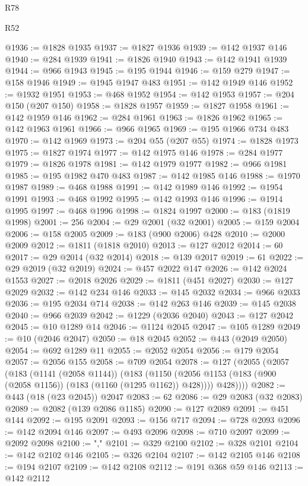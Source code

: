 \begin{lexlean}{R78}
\begin{lexlean}{R52}
\begin{coremodule}
{{{{{{{{{{{{{{{{{{{{{{{{{{{{{{{{{{{{{{{{{{{{{{{{{{{{{{{{{{{{{{{{{{{{{{{{{{{{{{{{{{{{{{{{{{{{{{{{{{{{{{{{{{{{{{{{{{{{{{{{{{{{{{{{{{{{{{{{{{{{{{{{{{{{{{{{{{{{{{{{{{{{{{{{{{{{{{{{{{{{{{{{{{{{{{{{{{{{{{@1936 := @1828 @1935
@1937 := @1827 @1936
@1939 := @142 @1937 @146
@1940 := @284 @1939
@1941 := @1826 @1940
@1943 := @142 @1941 @1939
@1944 := @966 @1943
@1945 := @195 @1944
@1946 := @159 @279
@1947 := @158 @1946
@1949 := @1945 @1947 @483
@1951 := @142 @1949 @146
@1952 := @1932 @1951
@1953 := @468 @1952
@1954 := @142 @1953
@1957 := @204 @150 (@207 @150)
@1958 := @1828 @1957
@1959 := @1827 @1958
@1961 := @142 @1959 @146
@1962 := @284 @1961
@1963 := @1826 @1962
@1965 := @142 @1963 @1961
@1966 := @966 @1965
@1969 := @195 @1966 @734 @483
@1970 := @142 @1969
@1973 := @204 @55 (@207 @55)
@1974 := @1828 @1973
@1975 := @1827 @1974
@1977 := @142 @1975 @146
@1978 := @284 @1977
@1979 := @1826 @1978
@1981 := @142 @1979 @1977
@1982 := @966 @1981
@1985 := @195 @1982 @470 @483
@1987 := @142 @1985 @146
@1988 := @1970 @1987
@1989 := @468 @1988
@1991 := @142 @1989 @146
@1992 := @1954 @1991
@1993 := @468 @1992
@1995 := @142 @1993 @146
@1996 := @1914 @1995
@1997 := @468 @1996
@1998 := @1824 @1997
@2000 := @183 (@1819 @1998)
@2001 := 256
@2004 := @29 @2001 (@32 @2001)
@2005 := @159 @2004
@2006 := @158 @2005
@2009 := @183 (@900 @2006) @428
@2010 := @2000 @2009
@2012 := @1811 (@1818 @2010)
@2013 := @127 @2012
@2014 := 60
@2017 := @29 @2014 (@32 @2014)
@2018 := @139 @2017
@2019 := 61
@2022 := @29 @2019 (@32 @2019)
@2024 := @457 @2022 @147
@2026 := @142 @2024 @1553
@2027 := @2018 @2026
@2029 := @1811 (@451 @2027)
@2030 := @127 @2029
@2032 := @142 @234 @146
@2033 := @145 @2032
@2034 := @966 @2033
@2036 := @195 @2034 @714
@2038 := @142 @263 @146
@2039 := @145 @2038
@2040 := @966 @2039
@2042 := @1229 (@2036 @2040)
@2043 := @127 @2042
@2045 := @10 @1289 @14
@2046 := @1124 @2045
@2047 := @105 @1289
@2049 := @10 (@2046 @2047)
@2050 := @18 @2045
@2052 := @443 (@2049 @2050)
@2054 := @692 @1289 @11
@2055 := @2052 @2054
@2056 := @179 @2054
@2057 := @2056 @155
@2058 := @709 @2054
@2078 := @127
    (@2055
      (@2057
        (@183
          (@1141 (@2058 @1144))
          (@183
            (@1150 (@2056 @1153 (@183 (@900 (@2058 @1156)) (@183 (@1160 (@1295 @1162)) @428))))
            @428))))
@2082 := @443 (@18 (@23 @2045)) @2047
@2083 := 62
@2086 := @29 @2083 (@32 @2083)
@2089 := @2082 (@139 @2086 @1185)
@2090 := @127 @2089
@2091 := @451 @144
@2092 := @195 @2091
@2093 := @156 @717
@2094 := @728 @2093
@2096 := @142 @2094 @146
@2097 := @493 @2096
@2098 := @710 @2097
@2099 := @2092 @2098
@2100 := ","
@2101 := @329 @2100
@2102 := @328 @2101
@2104 := @142 @2102 @146
@2105 := @326 @2104
@2107 := @142 @2105 @146
@2108 := @194 @2107
@2109 := @142 @2108
@2112 := @191 @368 @59 @146
@2113 := @142 @2112
}}}}}}}}}}}}}}}}}}}}}}}}}}}}}}}}}}}}}}}}}}}}}}}}}}}}}}}}}}}}}}}}}}}}}}}}}}}}}}}}}}}}}}}}}}}}}}}}}}}}}}}}}}}}}}}}}}}}}}}}}}}}}}}}}}}}}}}}}}}}}}}}}}}}}}}}}}}}}}}}}}}}}}}}}}}}}}}}}}}}}}}}}}}}}}}}}}}}}}
\end{coremodule}
\end{lexlean}
\end{lexlean}

